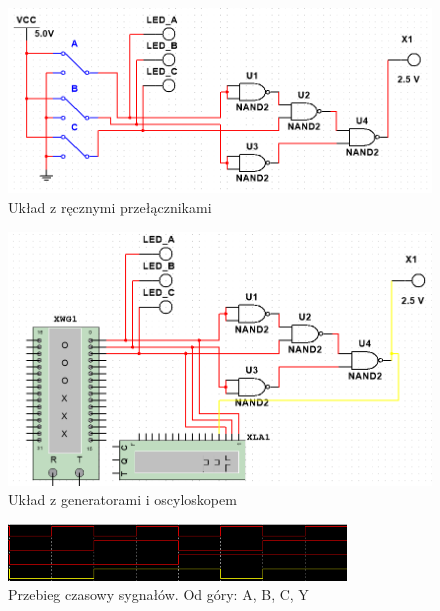 \documentclass[12pt,a4paper,openright]{mwrep}
\begin{document}
\begin{figure}[H]
    \centering
    \includegraphics[width=1\textwidth]{images/1a_circuit_simple.png}
    \caption{Układ z ręcznymi przełącznikami}
    \label{rys:1a_circuit_simple}
\end{figure}

\begin{figure}[H]
    \centering
    \includegraphics[width=1\textwidth]{images/1a_circuit_word_generator.png}
    \caption{Układ z generatorami i oscyloskopem}
    \label{rys:1a_circuit_with_generators}
\end{figure}

\begin{figure}[H]
    \centering
    \includegraphics[width=0.8\textwidth]{images/1a_timeseries.png}
    \caption{Przebieg czasowy sygnałów. Od góry: A, B, C, Y}
    \label{rys:1a_timeseries}
\end{figure}

\newpage
\end{document}
